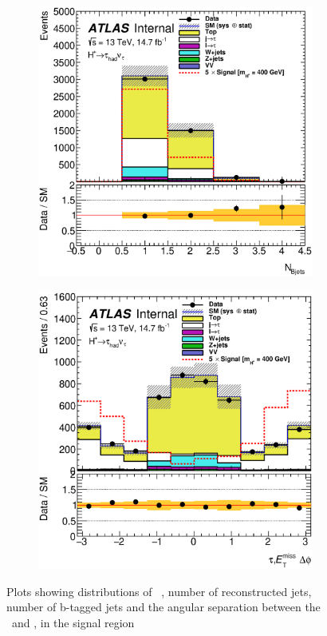 \begin{figure}[!h]
\begin{subfigure}{0.5\textwidth}
\end{subfigure}
\begin{subfigure}{0.5\textwidth}
   \includegraphics[width=\textwidth]{figures/bJets_SR.eps}
\end{subfigure} %
\begin{subfigure}{0.5\textwidth}
   \includegraphics[width=\textwidth]{figures/tauMetPhi_SR.eps}
\end{subfigure}
\caption{Plots showing distributions of \tauvis\ \pt, number of reconstructed 
jets, number of b-tagged jets and the angular separation between the \tauvis\ and \met, 
 in the signal region}
\label{fig:secSRa}
\end{figure}

